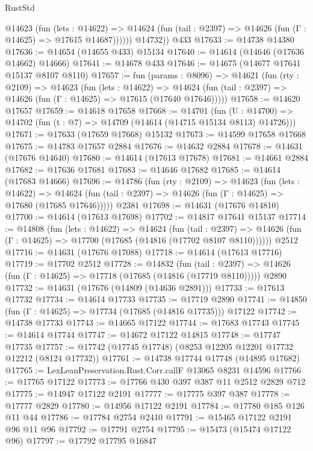\begin{lexlean}{RustStd}
\begin{coremodule}
            @14623
              (fun (lets : @14622) =>
              @14624 (fun (tail : @2397) => @14626 (fun (Γ : @14625) => @17615 @14687))))))
        @14732))
    @433
@17633 := @14738 @14380
@17636 := @14654 (@14655 @433) @15134
@17640 := @14614 (@14646 (@17636 @14662) @14666)
@17641 := @14678 @433
@17646 := @14675 (@14677 @17641 @15137 @8107 @8110)
@17657 := fun (params : @8096) =>
  @14621
    (fun (rty : @2109) =>
    @14623
      (fun (lets : @14622) =>
      @14624 (fun (tail : @2397) => @14626 (fun (Γ : @14625) => @17615 (@17640 @17646)))))
@17658 := @14620 @17657
@17659 := @14618 @17658
@17668 := @14701
    (fun (U : @14700) => @14702 (fun (t : @7) => @14709 (@14614 (@14715 @15134 @8113) @14726)))
@17671 := @17633 (@17659 @17668) @15132
@17673 := @14599 @17658 @17668
@17675 := @14783 @17657 @2884
@17676 := @14632 @2884
@17678 := @14631 (@17676 @14640)
@17680 := @14614 (@17613 @17678)
@17681 := @14661 @2884
@17682 := @17636 @17681
@17683 := @14646 @17682
@17685 := @14614 (@17683 @14666)
@17696 := @14786
    (fun (rty : @2109) =>
    @14623
      (fun (lets : @14622) =>
      @14624 (fun (tail : @2397) => @14626 (fun (Γ : @14625) => @17680 (@17685 @17646)))))
    @2381
@17698 := @14631 (@17676 @14810)
@17700 := @14614 (@17613 @17698)
@17702 := @14817 @17641 @15137
@17714 := @14808
    (fun (lets : @14622) =>
    @14624
      (fun (tail : @2397) =>
      @14626 (fun (Γ : @14625) => @17700 (@17685 (@14816 (@17702 @8107 @8110))))))
    @2512
@17716 := @14631 (@17676 @17088)
@17718 := @14614 (@17613 @17716)
@17719 := @17702 @2512
@17728 := @14832
    (fun (tail : @2397) => @14626 (fun (Γ : @14625) => @17718 (@17685 (@14816 (@17719 @8110)))))
    @2890
@17732 := @14631 (@17676 (@14809 (@14636 @2891)))
@17733 := @17613 @17732
@17734 := @14614 @17733
@17735 := @17719 @2890
@17741 := @14850 (fun (Γ : @14625) => @17734 (@17685 (@14816 @17735))) @17122
@17742 := @14738 @17733
@17743 := @14665 @17122
@17744 := @17683 @17743
@17745 := @14614 @17744
@17747 := @14672 @17122 @14815
@17748 := @17747 @17735
@17757 := @17742 (@17745 @17748) (@8253 @12205 @12201 @17732 @12212 (@8124 @17732))
@17761 := @14738 @17744 @17748 (@14895 @17682)
@17765 := LexLeanPreservation.Rust.Corr.callF @13065 @8231 @14596
@17766 := @17765 @17122
@17773 := @17766 @430 @397 @387 @11 @2512 @2829 @712
@17775 := @14947 @17122 @2191
@17777 := @17775 @397 @387
@17778 := @17777 @2829
@17780 := @14956 @17122 @2191
@17784 := @17780 @185 @126 @11 @44
@17786 := @17784 @2754 @2410
@17791 := @15465 @17122 @2191 @96 @11 @96
@17792 := @17791 @2754
@17795 := @15473 (@15474 @17122 @96)
@17797 := @17792 @17795 @16847

\end{coremodule}
\end{lexlean}
